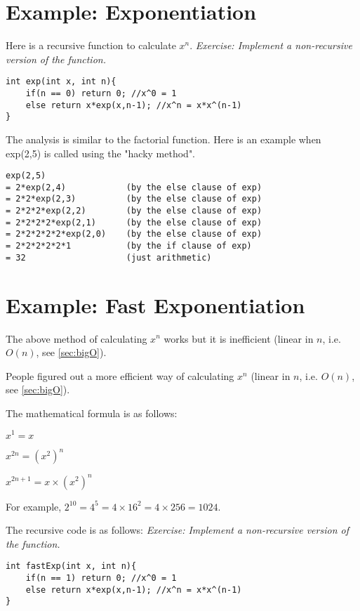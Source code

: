\section{Example: Exponentiation}

Here is a recursive function to calculate $x^n$. \textit{Exercise: Implement a non-recursive version of the function.}

\begin{lstlisting}
int exp(int x, int n){
    if(n == 0) return 0; //x^0 = 1
    else return x*exp(x,n-1); //x^n = x*x^(n-1)
}
\end{lstlisting}

The analysis is similar to the factorial function. Here is an example when exp(2,5) is called using the "hacky method".

\begin{lstlisting}
exp(2,5)
= 2*exp(2,4)            (by the else clause of exp)
= 2*2*exp(2,3)          (by the else clause of exp)
= 2*2*2*exp(2,2)        (by the else clause of exp)
= 2*2*2*2*exp(2,1)      (by the else clause of exp)
= 2*2*2*2*2*exp(2,0)    (by the else clause of exp)
= 2*2*2*2*2*1           (by the if clause of exp)
= 32                    (just arithmetic)
\end{lstlisting}

\section{Example: Fast Exponentiation}

The above method of calculating $x^n$ works but it is inefficient (linear in $n$, i.e. $O(n)$, see \cref{sec:bigO}). 

People figured out a more efficient way of calculating $x^n$ (linear in $n$, i.e. $O(n)$, see \cref{sec:bigO}). 

The mathematical formula is as follows:

\begin{center}
$x^1 = x$

$x^{2n} = (x^2)^n$

$x^{2n+1} = x \times (x^2)^n$
\end{center}

For example, $2^{10} = 4^5 = 4\times 16^2 = 4\times 256 = 1024$.

The recursive code is as follows: \textit{Exercise: Implement a non-recursive version of the function.}

\begin{lstlisting}
int fastExp(int x, int n){
    if(n == 1) return 0; //x^0 = 1
    else return x*exp(x,n-1); //x^n = x*x^(n-1)
}
\end{lstlisting}
